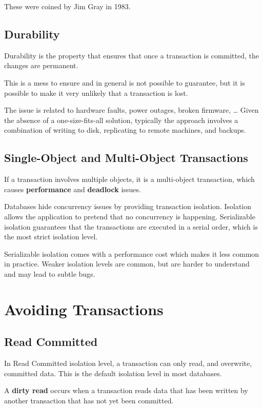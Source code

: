These were coined by Jim Gray in 1983.

\subsection{Durability}
Durability is the property that ensures that once a transaction is committed, the changes are permanent.

This is a mess to ensure and in general is not possible to guarantee, but it is possible to make it very unlikely that a transaction is lost.

The issue is related to hardware faults, power outages, broken firmware, \dots
Given the absence of a one-size-fits-all solution, typically the approach involves a combination of writing to disk, replicating to remote machines, and backups.

\subsection{Single-Object and Multi-Object Transactions}
If a transaction involves multiple objects, it is a multi-object transaction, which causes \textbf{performance} and \textbf{deadlock} issues.


Databases hide concurrency issues by providing transaction isolation.
Isolation allows the application to pretend that no concurrency is happening.
Serializable isolation guarantees that the transactions are executed in a serial order, which is the most strict isolation level.

Serializable isolation comes with a performance cost which makes it less common in practice.
Weaker isolation levels are common, but are harder to understand and may lead to subtle bugs.

\section{Avoiding Transactions}
\subsection{Read Committed}
In Read Committed isolation level, a transaction can only read, and overwrite, committed data.
This is the default isolation level in most databases.

\begin{definition}
   A \textbf{dirty read} occurs when a transaction reads data that has been written by another transaction that has not yet been committed.
\end{definition}


